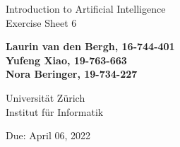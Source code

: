 \documentclass[12pt]{article}
\begin{document}
\begin{titlepage}

\begin{flushleft}

\vspace{2cm}

{\Large Introduction to Artificial Intelligence\\Exercise Sheet 6}\\

\vspace{4cm}

\textbf{Laurin van den Bergh, 16-744-401\\Yufeng Xiao, 19-763-663\\Nora Beringer, 19-734-227}\\

\vspace{2cm}

Universität Zürich\\
Institut für Informatik

\vfill Due: April 06, 2022

\vspace{3cm}


\end{flushleft}
\end{titlepage}

\newpage
\end{document}
